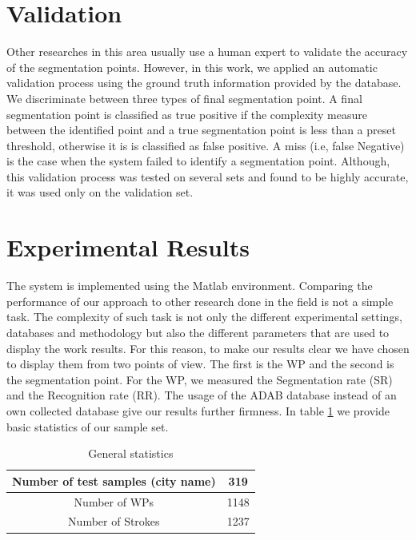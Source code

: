 \documentclass[journal,compsoc]{IEEEtran}
\begin{document}
\section{Validation}
\label{sec:validation}
Other researches in this area usually use a human expert to validate the accuracy of the segmentation points. However, in this work, we applied an automatic validation process using the ground truth information provided by the database. We discriminate between three types of final segmentation point. A final segmentation point is classified as true positive if the complexity measure between the identified point and a true segmentation point is less than a preset threshold, otherwise it is is classified as false positive. A miss (i.e, false Negative) is the case when the system failed to identify a segmentation point. Although, this validation process was tested on several sets and found to be highly accurate, it was used only on the validation set.


\section{Experimental Results}
\label{sec:results}
The system is implemented using the Matlab environment. Comparing the performance of our approach to other research done in the field is not a simple task. The complexity of such task is not only the different experimental settings, databases and methodology but also the different parameters that are used to display the work results. For this reason, to make our results clear we have chosen to display them from two points of view. The first is the WP and the second is the segmentation point. For the WP, we measured the Segmentation rate (SR) and the Recognition rate (RR).  The usage of the ADAB database instead of an own collected database give our results further firmness. In table \ref{table:general_stats} we provide basic statistics of our sample set.\\

\begin{table}[h]
\caption{General statistics}
\begin{tabular}{ | c | c | }
  \hline
  Number of test samples (city name) & 319 \\
  \hline
  Number of WPs & 1148 \\
  \hline
  Number of Strokes & 1237 \\
  \hline
\end{tabular}
\centering
\label{table:general_stats} 
\end{table}
\end{document}
